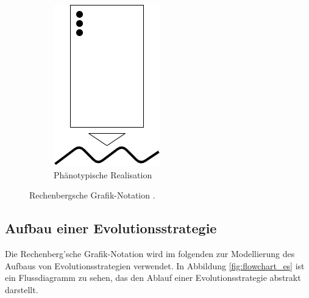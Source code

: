 \begin{figure}[!htb]
\begin{subfigure}{.3\textwidth}
	\centering
	\includegraphics[width=.5\linewidth]{img/rechenberg_notation/phaenotypische_realisation.png}
	\caption{Phänotypische Realisation}
	\label{fig:phaenotypische_realisation}
\end{subfigure}
\caption{Rechenbergsche Grafik-Notation \cite[S. 145]{schoeneburg}.}
\label{fig:rechenberg}
\end{figure}


\subsection{Aufbau einer Evolutionsstrategie}

Die Rechenberg'sche Grafik-Notation wird im folgenden zur Modellierung des Aufbaus von Evolutionsstrategien verwendet. In Abbildung \ref{fig:flowchart_es} ist ein Flussdiagramm zu sehen, das den Ablauf einer Evolutionsstrategie abstrakt darstellt.

